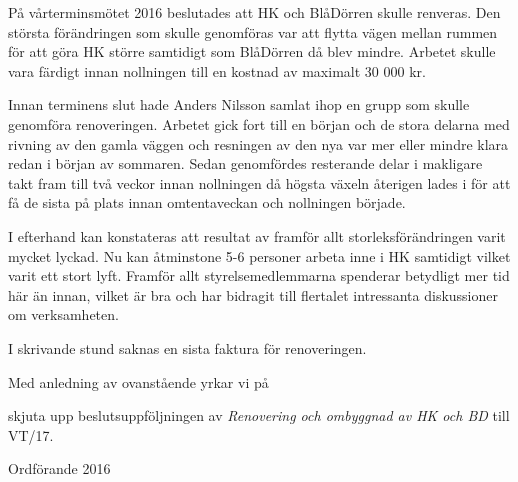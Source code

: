 \documentclass[../_main/handlingar.tex]{subfiles}
\begin{document}

På vårterminsmötet 2016 beslutades att HK och BlåDörren skulle renveras. Den största förändringen som skulle genomföras var att flytta vägen mellan rummen för att göra HK större samtidigt som BlåDörren då blev mindre. Arbetet skulle vara färdigt innan nollningen till en kostnad av maximalt 30 000 kr.

Innan terminens slut hade Anders Nilsson samlat ihop en grupp som skulle genomföra renoveringen. Arbetet gick fort till en början och de stora delarna med rivning av den gamla väggen och resningen av den nya var mer eller mindre klara redan i början av sommaren. Sedan genomfördes resterande delar i makligare takt fram till två veckor innan nollningen då högsta växeln återigen lades i för att få de sista på plats innan omtentaveckan och nollningen började.

I efterhand kan konstateras att resultat av framför allt storleksförändringen varit mycket lyckad. Nu kan åtminstone 5-6 personer arbeta inne i HK samtidigt vilket varit ett stort lyft. Framför allt styrelsemedlemmarna spenderar betydligt mer tid här än innan, vilket är bra och har bidragit till flertalet intressanta diskussioner om verksamheten.

I skrivande stund saknas en sista faktura för renoveringen.

Med anledning av ovanstående yrkar vi på

\begin{attsatser}
    \att skjuta upp beslutsuppföljningen av \emph{Renovering och ombyggnad av HK och BD} till VT/17.
\end{attsatser}

\begin{signatures}{1}
    \ist
    \signature{\ordf}{Ordförande 2016}
\end{signatures}
\end{document}
